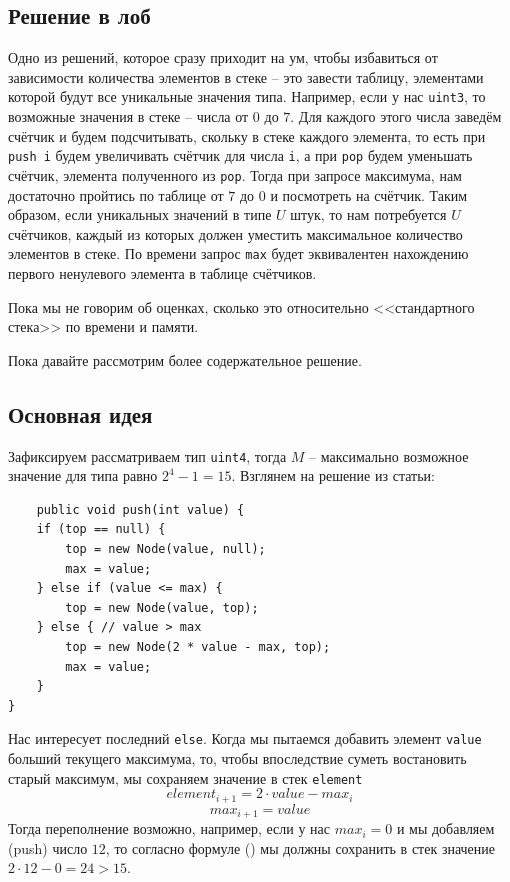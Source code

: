\subsection{Решение в лоб}

Одно из решений, которое сразу приходит на ум, чтобы избавиться от зависимости количества элементов в стеке -- это завести таблицу, элементами которой будут все уникальные значения типа. Например, если у нас \texttt{uint3}, то возможные значения в стеке -- числа от \(0\) до \(7\). Для каждого этого числа заведём счётчик и будем подсчитывать, скольку в стеке каждого элемента, то есть при \texttt{push i} будем увеличивать счётчик для числа \texttt{i}, а при \texttt{pop} будем уменьшать счётчик, элемента полученного из \texttt{pop}. Тогда при запросе максимума, нам достаточно пройтись по таблице от \(7\) до \(0\) и посмотреть на счётчик. 
Таким образом, если уникальных значений в типе \(U\) штук, то нам потребуется \(U\) счётчиков, каждый из которых должен уместить максимальное количество элементов в стеке. По времени запрос \texttt{max} будет эквивалентен нахождению первого ненулевого элемента в таблице счётчиков. 

Пока мы не говорим об оценках, сколько это относительно <<стандартного стека>> по времени и памяти.

Пока давайте рассмотрим более содержательное решение. 

\subsection{Основная идея}

Зафиксируем рассматриваем тип \texttt{uint4}, тогда \(M\) -- максимально возможное значение для типа равно \(2^4 - 1 = 15\).
Взглянем на решение из статьи:
\begin{verbatim}
    public void push(int value) {
    if (top == null) {
        top = new Node(value, null);
        max = value;
    } else if (value <= max) {
        top = new Node(value, top);
    } else { // value > max
        top = new Node(2 * value - max, top);
        max = value;
    }
}
\end{verbatim}
Нас интересует последний \texttt{else}. Когда мы пытаемся добавить элемент \texttt{value} больший текущего максимума, то, чтобы впоследствие суметь востановить старый максимум, мы сохраняем значение в стек \texttt{element}
\begin{dmath}[labelN={1}]
    element_{i+1} = 2\cdot value - max_i
\end{dmath}
\begin{dmath}[labelN={2}]
    max_{i+1} = value
\end{dmath}
Тогда переполнение возможно, например, если у нас \(max_i = 0\) и мы добавляем (push) число \(12\), то согласно формуле () мы должны сохранить в стек значение \(2\cdot 12 - 0 = 24 > 15\).

